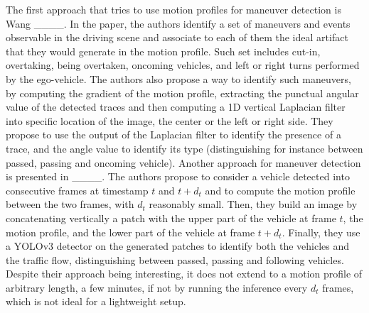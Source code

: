 The first approach that tries to use motion profiles for maneuver detection is Wang \etal ____. 
In the paper, the authors identify a set of maneuvers and events observable in the driving scene and associate to each of them the ideal artifact that they would generate in the motion profile.
Such set includes cut-in, overtaking, being overtaken, oncoming vehicles, and left or right turns performed by the ego-vehicle.
The authors also propose a way to identify such maneuvers, by computing the gradient of the motion profile, extracting the punctual angular value of the detected traces and then computing a 1D vertical Laplacian filter into specific location of the image, \eg the center or the left or right side.
They propose to use the output of the Laplacian filter to identify the presence of a trace, and the angle value to identify its type (distinguishing for instance between passed, passing and oncoming vehicle).
Another approach for maneuver detection is presented in \kilicarslan {} ____.
The authors propose to consider a vehicle detected into consecutive frames at timestamp $t$ and $t + d_t$ and to compute the motion profile between the two frames, with $d_t$ reasonably small. Then, they build an image by concatenating vertically a patch with the upper part of the vehicle at frame $t$, the motion profile, and the lower part of the vehicle at frame $t + d_t$.
Finally, they use a YOLOv3 detector on the generated patches to identify both the vehicles and the traffic flow, \ie distinguishing between passed, passing and following vehicles.
Despite their approach being interesting, it does not extend to a motion profile of arbitrary length, \eg a few minutes, if not by running the inference every $d_t$ frames, which is not ideal for a lightweight setup.